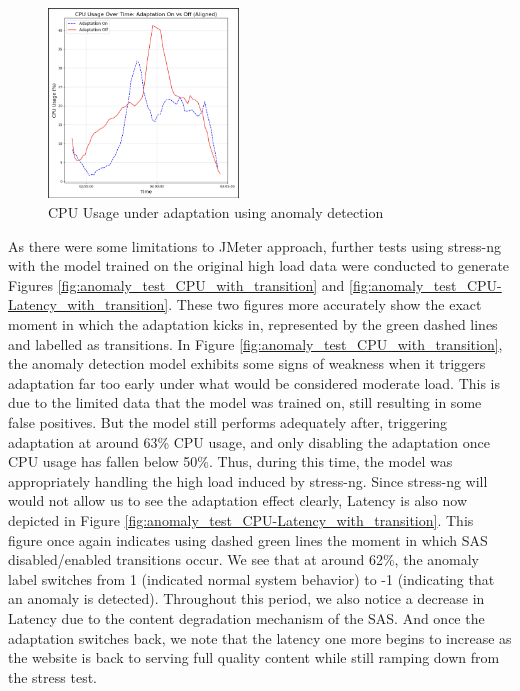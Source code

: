 \documentclass[conference]{IEEEtran}
\begin{document}
\begin{figure}[H]
    \centering
    \includegraphics[width=0.45\textwidth]{./media/anomaly_test_CPU.png}
    \caption{CPU Usage under adaptation using anomaly detection}
    \label{fig:anomaly_test_CPU}
\end{figure}

As there were some limitations to JMeter approach, further tests using stress-ng with the model trained on the original high load data were conducted to generate Figures \ref{fig:anomaly_test_CPU_with_transition} and \ref{fig:anomaly_test_CPU-Latency_with_transition}. These two figures more accurately show the exact moment in which the adaptation kicks in, represented by the green dashed lines and labelled as transitions. In Figure \ref{fig:anomaly_test_CPU_with_transition}, the anomaly detection model exhibits some signs of weakness when it triggers adaptation far too early under what would be considered moderate load. This is due to the limited data that the model was trained on, still resulting in some false positives. But the model still performs adequately after, triggering adaptation at around 63\% CPU usage, and only disabling the adaptation once CPU usage has fallen below 50\%. Thus, during this time, the model was appropriately handling the high load induced by stress-ng. Since stress-ng will would not allow us to see the adaptation effect clearly, Latency is also now depicted in Figure \ref{fig:anomaly_test_CPU-Latency_with_transition}. This figure once again indicates using dashed green lines the moment in which SAS disabled/enabled transitions occur. We see that at around 62\%, the anomaly label switches from 1 (indicated normal system behavior) to -1 (indicating that an anomaly is detected). Throughout this period, we also notice a decrease in Latency due to the content degradation mechanism of the SAS. And once the adaptation switches back, we note that the latency one more begins to increase as the website is back to serving full quality content while still ramping down from the stress test.
\end{document}

